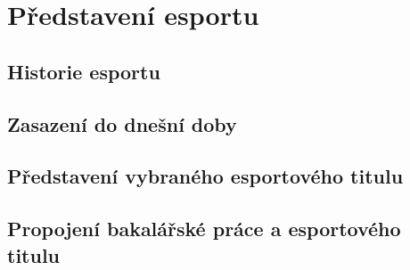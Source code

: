 \chapter{Představení esportu}
\section{Historie esportu}
\section{Zasazení do dnešní doby}
\section{Představení vybraného esportového titulu}
\section{Propojení bakalářské práce a esportového titulu}
